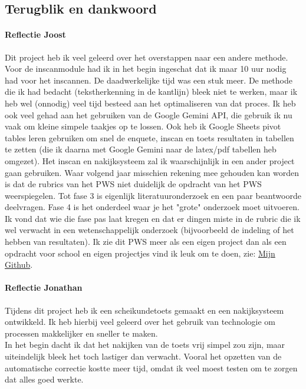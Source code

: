 \documentclass[12pt]{article}
\begin{document}
\subsection{Terugblik en dankwoord}
\begin{multicols}{2}
\noindent\begin{minipage}{\linewidth}
    
\paragraph*{Reflectie Joost} Dit project heb ik veel geleerd over het overstappen naar een andere methode. Voor de inscanmodule had ik in het begin ingeschat dat ik maar 10 uur nodig had voor het inscannen. De daadwerkelijke tijd was een stuk meer. De methode die ik had bedacht (tekstherkenning in de kantlijn) bleek niet te werken, maar ik heb wel (onnodig) veel tijd besteed aan het optimaliseren van dat proces. Ik heb ook veel gehad aan het gebruiken van de Google Gemini API, die gebruik ik nu vaak om kleine simpele taakjes op te lossen. Ook heb ik Google Sheets pivot tables leren gebruiken om snel de enquete, inscan en toets resultaten in tabellen te zetten (die ik daarna met Google Gemini naar de latex/pdf tabellen heb omgezet). Het inscan en nakijksysteem zal ik waarschijnlijk in een ander project gaan gebruiken. Waar volgend jaar misschien rekening mee gehouden kan worden is dat de rubrics van het PWS niet duidelijk de opdracht van het PWS weerspiegelen. Tot fase 3 is eigenlijk literatuuronderzoek en een paar beantwoorde deelvragen. Fase 4 is het onderdeel waar je het "grote" onderzoek moet uitvoeren. Ik vond dat wie die fase pas laat kregen en dat er dingen miste in de rubric die ik wel verwacht in een wetenschappelijk onderzoek (bijvoorbeeld de indeling of het hebben van resultaten). Ik zie dit PWS meer als een eigen project dan als een opdracht voor school en eigen projectjes vind ik leuk om te doen, zie: \href{https://github.com/TanteJossa}{Mijn Github}.  
\end{minipage}
\begin{minipage}{\linewidth}
\paragraph*{Reflectie Jonathan} Tijdens dit project heb ik een scheikundetoets gemaakt en een nakijksysteem ontwikkeld. 
Ik heb hierbij veel geleerd over het gebruik van technologie om processen makkelijker en sneller te maken. \\
In het begin dacht ik dat het nakijken van de toets vrij simpel zou zijn, maar uiteindelijk bleek het toch lastiger dan verwacht. 
Vooral het opzetten van de automatische correctie kostte meer tijd, omdat ik veel moest testen om te zorgen dat alles goed werkte.\\


\end{minipage}
\end{multicols}
\end{document}
